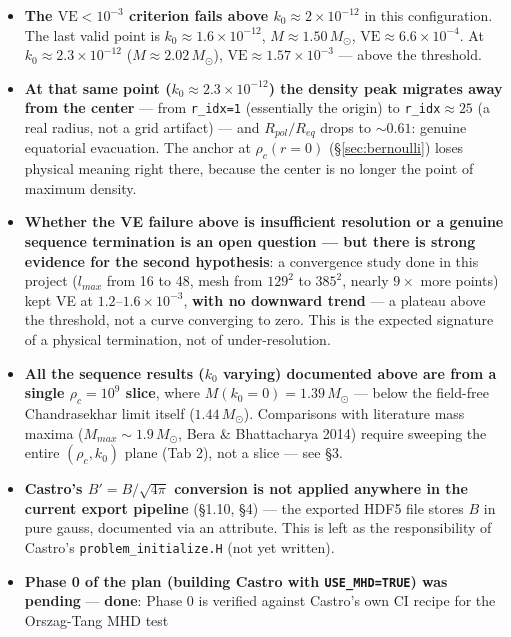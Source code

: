 \documentclass[11pt,a4paper]{scrartcl}
\newcommand{\code}[1]{\texttt{\small #1}}
\begin{document}
\begin{itemize}[leftmargin=1.4em,itemsep=0.4em]
\item \textbf{The $\mathrm{VE}<10^{-3}$ criterion fails above
  $k_0\approx2\times10^{-12}$} in this configuration. The last valid
  point is $k_0\approx1.6\times10^{-12}$, $M\approx1.50\,M_\odot$,
  $\mathrm{VE}\approx6.6\times10^{-4}$. At $k_0\approx2.3\times10^{-12}$
  ($M\approx2.02\,M_\odot$), $\mathrm{VE}\approx1.57\times10^{-3}$ ---
  above the threshold.
\item \textbf{At that same point ($k_0\approx2.3\times10^{-12}$) the
  density peak migrates away from the center} --- from \code{r\_idx=1}
  (essentially the origin) to \code{r\_idx}$\approx25$ (a real radius,
  not a grid artifact) --- and $R_{pol}/R_{eq}$ drops to $\sim0.61$:
  genuine equatorial evacuation. The anchor at $\rho_c(r{=}0)$
  (\S\ref{sec:bernoulli}) loses physical meaning right there, because
  the center is no longer the point of maximum density.
\item \textbf{Whether the VE failure above is insufficient resolution or
  a genuine sequence termination is an open question --- but there is
  strong evidence for the second hypothesis}: a convergence study done
  in this project ($l_{max}$ from 16 to 48, mesh from $129^2$ to
  $385^2$, nearly $9\times$ more points) kept VE at
  $1.2$--$1.6\times10^{-3}$, \textbf{with no downward trend} --- a
  plateau above the threshold, not a curve converging to zero. This is
  the expected signature of a physical termination, not of
  under-resolution.
\item \textbf{All the sequence results ($k_0$ varying) documented above
  are from a single $\rho_c=10^9$ slice}, where
  $M(k_0{=}0)=1.39\,M_\odot$ --- below the field-free Chandrasekhar
  limit itself ($1.44\,M_\odot$). Comparisons with literature mass
  maxima ($M_{max}\sim1.9\,M_\odot$, Bera \& Bhattacharya 2014) require
  sweeping the entire $(\rho_c,k_0)$ plane (Tab 2), not a slice --- see
  \S3.
\item \textbf{Castro's $B'=B/\sqrt{4\pi}$ conversion is not applied
  anywhere in the current export pipeline} (\S1.10, \S4) --- the
  exported HDF5 file stores $B$ in pure gauss, documented via an
  attribute. This is left as the responsibility of Castro's
  \code{problem\_initialize.H} (not yet written).
\item \textbf{Phase 0 of the plan (building Castro with
  \code{USE\_MHD=TRUE}) was pending} --- \textbf{done}: Phase 0 is
  verified against Castro's own CI recipe for the Orszag-Tang MHD test

\end{itemize}
\end{document}
